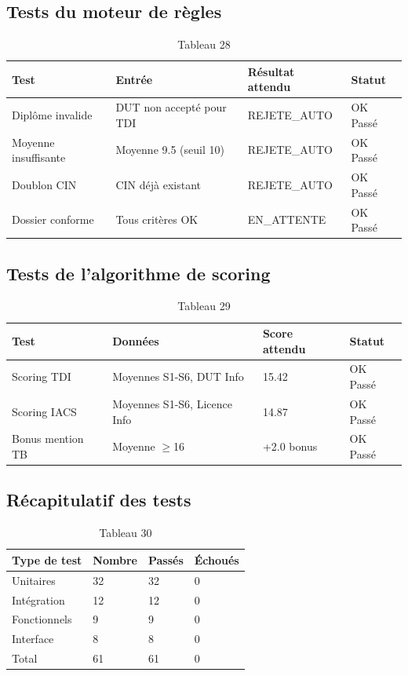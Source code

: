 \subsection{Tests du moteur de règles}

\begin{table}[htbp]
\centering
\begin{tabular}{|l|l|l|l|}
\hline
Test & Entrée & Résultat attendu & Statut \\
\hline
Diplôme invalide & DUT non accepté pour TDI & REJETE\_AUTO & OK Passé \\
\hline
Moyenne insuffisante & Moyenne 9.5 (seuil 10) & REJETE\_AUTO & OK Passé \\
\hline
Doublon CIN & CIN déjà existant & REJETE\_AUTO & OK Passé \\
\hline
Dossier conforme & Tous critères OK & EN\_ATTENTE & OK Passé \\
\hline
\end{tabular}
\caption{Tableau 28}
\label{tab:table_28}
\end{table}

\subsection{Tests de l'algorithme de scoring}

\begin{table}[htbp]
\centering
\begin{tabular}{|l|l|l|l|}
\hline
Test & Données & Score attendu & Statut \\
\hline
Scoring TDI & Moyennes S1-S6, DUT Info & 15.42 & OK Passé \\
\hline
Scoring IACS & Moyennes S1-S6, Licence Info & 14.87 & OK Passé \\
\hline
Bonus mention TB & Moyenne $\geq$16 & +2.0 bonus & OK Passé \\
\hline
\end{tabular}
\caption{Tableau 29}
\label{tab:table_29}
\end{table}

\subsection{Récapitulatif des tests}

\begin{table}[htbp]
\centering
\begin{tabular}{|l|l|l|l|}
\hline
Type de test & Nombre & Passés & Échoués \\
\hline
Unitaires & 32 & 32 & 0 \\
\hline
Intégration & 12 & 12 & 0 \\
\hline
Fonctionnels & 9 & 9 & 0 \\
\hline
Interface & 8 & 8 & 0 \\
\hline
Total & 61 & 61 & 0 \\
\hline
\end{tabular}
\caption{Tableau 30}
\label{tab:table_30}
\end{table}

